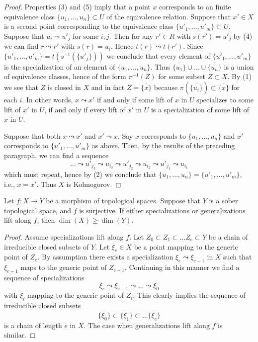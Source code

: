 \begin{proof}
Properties (3) and (5) imply that a point $x$ corresponds to an
finite equivalence class $\{u_1, \ldots, u_n\} \subset U$ of the equivalence
relation. Suppose that $x' \in X$ is a second point corresponding to
the equivalence class $\{u'_1, \ldots, u'_m\} \subset U$.
Suppose that $u_i \leadsto u'_j$ for some $i, j$. Then for any
$r' \in R$ with $s(r') = u'_j$ by (4) we can find $r \leadsto r'$
with $s(r) = u_i$. Hence $t(r) \leadsto t(r')$. Since
$\{u'_1, \ldots, u'_m\} = t(s^{-1}(\{u'_j\}))$ we conclude that
every element of $\{u'_1, \ldots, u'_m\}$ is the specialization of
an element of $\{u_1, \ldots, u_n\}$.
Thus $\overline{\{u_1\}} \cup \ldots \cup \overline{\{u_n\}}$ is
a union of equivalence classes, hence of the form $\pi^{-1}(Z)$
for some subset $Z \subset X$. By (1) we see that $Z$ is closed in $X$
and in fact $Z = \overline{\{x\}}$ because $\pi(\overline{\{u_i\}})
\subset \overline{\{x\}}$ for each $i$. In other words, $x \leadsto x'$
if and only if some lift of $x$ in $U$ specializes to some lift of
$x'$ in $U$, if and only if every lift of $x'$ in $U$ is a specialization
of some lift of $x$ in $U$.

\medskip\noindent
Suppose that both $x \leadsto x'$ and $x' \leadsto x$. Say $x$ corresponds
to $\{u_1, \ldots, u_n\}$ and $x'$ corresponds to $\{u'_1, \ldots, u'_m\}$
as above. Then, by the results of the preceding paragraph, we can find a
sequence
$$
\ldots \leadsto u'_{j_3} \leadsto u_{i_3} \leadsto u'_{j_2} \leadsto
u_{i_2} \leadsto u'_{j_1} \leadsto u_{i_1}
$$
which must repeat, hence by (2) we conclude that
$\{u_1, \ldots, u_n\} = \{u'_1, \ldots, u'_m\}$, i.e., $x = x'$.
Thus $X$ is Kolmogorov.
\end{proof}


\begin{lemma}
\label{lemma-dimension-specializations-lift}
Let $f : X \to Y$ be a morphism of topological spaces.
Suppose that $Y$ is a sober topological space, and $f$ is surjective.
If either specializations or generalizations lift along $f$, then
$\dim(X) \geq \dim(Y)$.
\end{lemma}

\begin{proof}
Assume specializations lift along $f$.
Let $Z_0 \subset Z_1 \subset \ldots Z_e \subset Y$ be a chain
of irreducible closed subsets of $Y$. Let $\xi_e \in X$ be a point
mapping to the generic point of $Z_e$. By assumption there
exists a specialization
$\xi_e \leadsto \xi_{e - 1}$ in $X$ such that $\xi_{e - 1}$ maps to
the generic point of $Z_{e - 1}$. Continuing in this manner we find
a sequence of specializations
$$
\xi_e \leadsto \xi_{e - 1} \leadsto \ldots \leadsto \xi_0
$$
with $\xi_i$ mapping to the generic point of $Z_i$.
This clearly implies the sequence of irreducible closed
subsets
$$
\overline{\{\xi_0\}} \subset
\overline{\{\xi_1\}} \subset \ldots
\overline{\{\xi_e\}}
$$
is a chain of length $e$ in $X$.
The case when generalizations lift along $f$ is similar.
\end{proof}

